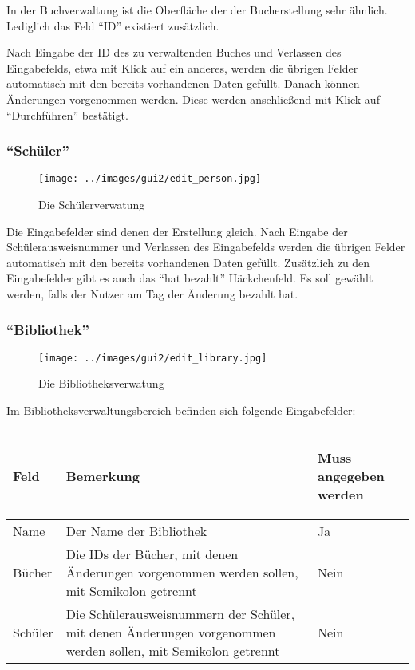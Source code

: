 In der Buchverwaltung ist die Oberfläche der der Bucherstellung sehr ähnlich. Lediglich das Feld ``ID'' existiert zusätzlich.

Nach Eingabe der ID des zu verwaltenden Buches und Verlassen des Eingabefelds, etwa mit Klick auf ein anderes, werden die übrigen Felder automatisch mit den bereits vorhandenen Daten gefüllt.
Danach können Änderungen vorgenommen werden. Diese werden anschließend mit Klick auf ``Durchführen'' bestätigt.


\subsubsection{``Schüler''}
\label{subsubsec:detail:edit:person}
\begin{figure}\texttt{[image: ../images/gui2/edit\_person.jpg]}\caption{Die Schülerverwatung}\label{fig:edit_person}\end{figure}

Die Eingabefelder sind denen der Erstellung gleich. Nach Eingabe der Schülerausweisnummer und Verlassen des Eingabefelds werden die übrigen Felder automatisch mit den bereits vorhandenen Daten gefüllt.
Zusätzlich zu den Eingabefelder gibt es auch das ``hat bezahlt'' Häckchenfeld. Es soll gewählt werden, falls der Nutzer am Tag der Änderung bezahlt hat.


\subsubsection{``Bibliothek''}
\label{subsubsec:detail:edit:library}
\begin{figure}\texttt{[image: ../images/gui2/edit\_library.jpg]}\caption{Die Bibliotheksverwatung}\label{fig:edit_library}\end{figure}

Im Bibliotheksverwaltungsbereich befinden sich folgende Eingabefelder:

\begin{tabular}{|p{}|p{}|p{}|}\hline
\begin{center}Feld\end{center} & \begin{center}Bemerkung\end{center} & \begin{center}Muss angegeben werden\end{center}\\
\hline
Name & Der Name der Bibliothek & Ja\\
\hline
Bücher & Die IDs der Bücher, mit denen Änderungen vorgenommen werden sollen, mit Semikolon getrennt & Nein\\
\hline
Schüler & Die Schülerausweisnummern der Schüler, mit denen Änderungen vorgenommen werden sollen, mit Semikolon getrennt & Nein\\
\hline
\end{tabular}

